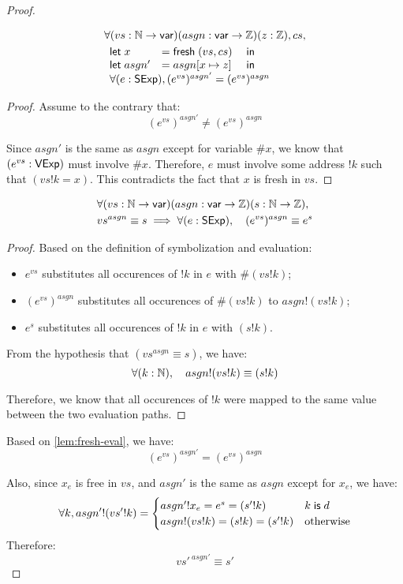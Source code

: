 \begin{proof}
\begin{lemma}
\label{lem:fresh-eval}
\begin{align*}
&\forall (vs:\Nat\to\Var)(asgn:\Var\to\Int)(z:\Int),cs,\\
&\begin{array}[t]{lll}
\letin{x&}{\Fresh(vs,cs)&}\\
\letin{asgn'&}{\update{asgn}{x}{z}&}\\
\multicolumn{3}{l}{\forall (e:\Sexp),(e^{vs})^{asgn'}=(e^{vs})^{asgn}}
\end{array}
\end{align*}
\begin{proof}
Assume to the contrary that: \[(e^{vs})^{asgn'}\neq(e^{vs})^{asgn}\]

Since $asgn'$ is the same as $asgn$ except for variable $\#x$, we know that
$(e^{vs}:\mathsf{VExp})$ must involve $\#x$.  Therefore, $e$ must involve some address
$!k$ such that $(vs!k=x)$.  This contradicts the fact that $x$ is fresh in $vs$.
\end{proof}
\end{lemma}

\begin{lemma}
\label{lem:sym-eval}
\begin{align*}
&\forall(vs:\mathbb N\to\mathsf{var})(asgn:\mathsf{var}\to\mathbb Z)(s:\mathbb N\to\mathbb Z),\\
&vs^{asgn}\equiv s\implies\forall (e:\mathsf{SExp}),\quad(e^{vs})^{asgn}\equiv e^s
\end{align*}
\begin{proof}
Based on the definition of symbolization and evaluation:
\begin{itemize}
\item $e^{vs}$ substitutes all occurences of $!k$ in $e$ with $\#(vs!k)$;
\item $(e^{vs})^{asgn}$ substitutes all occurences of $\#(vs!k)$ to $asgn!(vs!k)$;
\item $e^s$ substitutes all occurences of $!k$ in $e$ with $(s!k)$.
\end{itemize}

From the hypothesis that $(vs^{asgn}\equiv s)$, we have:
\[\forall (k:\mathbb N),\quad asgn!(vs!k)\equiv (s!k)\]

Therefore, we know that all occurences of $!k$ were mapped to the same value
between the two evaluation paths.
\end{proof}
\end{lemma}

Based on \autoref{lem:fresh-eval}, we have:
\[{(e^{vs})}^{asgn'}={(e^{vs})}^{asgn}\]



Also, since $x_e$ is free in $vs$, and $asgn'$ is the same as $asgn$ except for
$x_e$, we have:
\[\forall k,asgn'!(vs'!k)=\begin{cases}
asgn'!x_e=e^s=(s'!k)&k\;\mathsf{is}\; d\\
asgn!(vs!k)=(s!k)=(s'!k)&\text{otherwise}
\end{cases}\]
Therefore:\[vs'^{~asgn'}\equiv s'\]
\end{proof}

